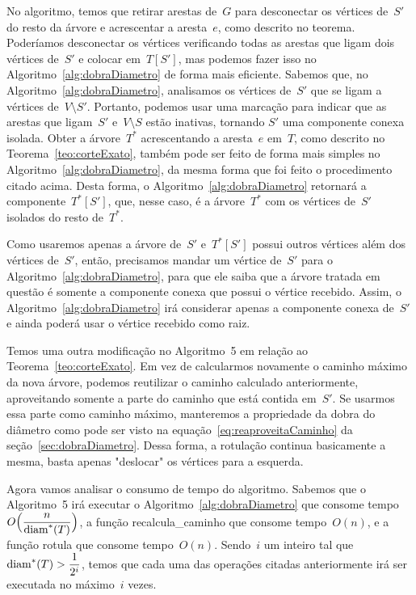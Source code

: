 		No algoritmo, temos que 
		retirar arestas de~$G$ para 
		desconectar os vértices de~$S'$ do resto da árvore
		e acrescentar a aresta~$e$, como descrito no teorema.
		Poderíamos desconectar os vértices verificando todas as arestas que 
		ligam dois vértices de~$S'$ e colocar em~$T[S']$, mas podemos
		fazer isso no Algoritmo~\ref{alg:dobraDiametro} de forma 
		mais eficiente. 
		Sabemos que, no Algoritmo~\ref{alg:dobraDiametro},
		analisamos os vértices de~$S'$ que se ligam a vértices 
		de~$V\setminus S'$. 
		Portanto, podemos usar uma marcação para indicar que as 
		arestas que ligam~$S'$ e~${V\setminus S}$ estão inativas, 
		tornando $S'$ uma componente conexa isolada. 
		Obter a árvore~$T^*$ acrescentando a aresta~$e$ em~$T$, como descrito no
		Teorema~\ref{teo:corteExato}, também pode ser feito de 
		forma mais simples no Algoritmo~\ref{alg:dobraDiametro},
		da mesma forma que foi feito o procedimento citado acima.
		Desta forma, o Algoritmo~\ref{alg:dobraDiametro} retornará
		a componente~$T^*[S']$, que, nesse caso, é a árvore~$T^*$ com
		os vértices de~$S'$ isolados do resto de~$T^*$.

		Como usaremos apenas a árvore de~$S'$ e~$T^*[S']$ possui outros 
		vértices além dos vértices de~$S'$,
		então, precisamos mandar um vértice de~$S'$ para
		o Algoritmo~\ref{alg:dobraDiametro},
		para que ele saiba que a árvore tratada em questão é
		somente a componente conexa que possui o vértice recebido.
		Assim, o Algoritmo~\ref{alg:dobraDiametro} irá considerar
		apenas a componente conexa de~$S'$ e ainda
		poderá usar o vértice recebido como raiz.


		Temos uma outra modificação no 
		Algoritmo~5   
		em relação ao Teorema~\ref{teo:corteExato}.
		Em vez de calcularmos novamente o caminho máximo da nova
		árvore, podemos reutilizar o caminho calculado anteriormente,
		aproveitando somente a parte do caminho que está contida 
		em~$S'$. 
		Se usarmos essa parte como caminho máximo,
		manteremos a propriedade da dobra do diâmetro como pode
		ser visto na equação~\ref{eq:reaproveitaCaminho} da 
		seção~\ref{sec:dobraDiametro}. 
		Dessa forma, a rotulação continua basicamente a mesma,
		basta apenas "deslocar" os vértices para a esquerda.

		\bigskip

		Agora vamos analisar o consumo de tempo do algoritmo.
		Sabemos que o Algoritmo~5 
		irá executar
		o Algoritmo~\ref{alg:dobraDiametro} que consome 
		tempo ~${O\Big(\dfrac{n}{\mathrm{diam}^*(T)}\Big)}$, a função
		{\sc recalcula\_caminho} que consome tempo~$O(n)$, e a função
		{\sc rotula} que consome tempo~$O(n)$.
		Sendo~$i$ um inteiro tal que~$\mathrm{diam}^*(T)>\dfrac{1}{2^i}$, 
		temos que cada uma das operações citadas anteriormente
		irá ser executada no máximo~$i$ vezes.

